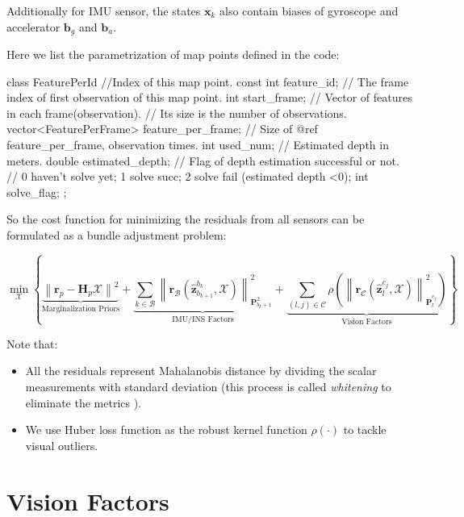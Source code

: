 \documentclass[12pt]{report}   %
\begin{document}
Additionally for IMU sensor, the states $\mathbf{x}_k$ also contain biases of gyroscope and accelerator $\mathbf{b}_g$ and $\mathbf{b}_a$.


Here we list the parametrization of map points defined in the code:

\begin{cppcode}
class FeaturePerId {
//Index of this map point.
const int feature_id;
// The frame index of first observation of this map point.
int start_frame;
// Vector of features in each frame(observation). 
// Its size is the number of observations.
vector<FeaturePerFrame> feature_per_frame;
// Size of @ref feature\_per\_frame, observation times.
int used_num;
// Estimated depth in meters.
double estimated_depth;
// Flag of depth estimation successful or not.
// 0 haven't solve yet; 1 solve succ; 2 solve fail (estimated depth <0);
int solve_flag;
};
\end{cppcode}


So the cost function for minimizing the residuals from all sensors can be formulated as a bundle adjustment problem:

\begin{equation}
	\min_{\mathcal{X}}  \left\{
		\underbrace{
			\left\|\mathbf{r}_{p}-\mathbf{H}_{p} \mathcal{X}\right\|^{2}
		}_{\text{Marginalization Priors}}
		+
		\underbrace{
			\sum_{k \in \mathcal{B}}\left\|\mathbf{r}_{\mathcal{B}}\left(\hat{\mathbf{z}}_{b_{k+1}}^{b_{k}}, \mathcal{X}\right)\right\|_{\mathbf{P}_{b_{k}+1}^{2}}^{2}
		}_{\text{IMU/INS Factors}}
		+
		\underbrace{
			\sum_{(l, j) \in \mathcal{C}} \rho\left(\left\|\mathbf{r}_{\mathcal{C}}\left(\hat{\mathbf{z}}_{l}^{c_{j}}, \mathcal{X}\right)\right\|_{\mathbf{P}_{l}^{c_{j}}}^{2}\right)
		}_{\text{Vision Factors}}
		\right\} \label{joint_optimization}
\end{equation}

Note that:
\begin{itemize}
	\item All the residuals represent Mahalanobis distance by dividing the scalar measurements with standard deviation (this process is called \textit{whitening} to eliminate the metrics \cite{dellaert2017factor}).
	\item We use Huber loss function as the robust kernel function $\rho(\cdot)$ to tackle visual outliers.
\end{itemize}


\section{Vision Factors}
\end{document}
